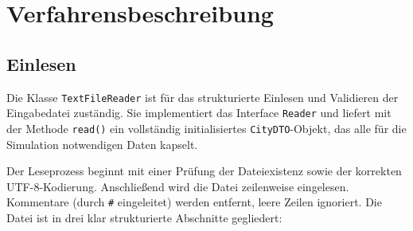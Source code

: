 \chapter{Verfahrensbeschreibung}

\section{Einlesen}

Die Klasse \texttt{TextFileReader} ist für das strukturierte Einlesen und Validieren der Eingabedatei zuständig.
Sie implementiert das Interface \texttt{Reader} und liefert mit der Methode \texttt{read()} ein vollständig initialisiertes \texttt{CityDTO}-Objekt,
das alle für die Simulation notwendigen Daten kapselt.

Der Leseprozess beginnt mit einer Prüfung der Dateiexistenz sowie der korrekten UTF-8-Kodierung.
Anschließend wird die Datei zeilenweise eingelesen. Kommentare (durch \texttt{\#} eingeleitet) werden entfernt,
leere Zeilen ignoriert. Die Datei ist in drei klar strukturierte Abschnitte gegliedert:

